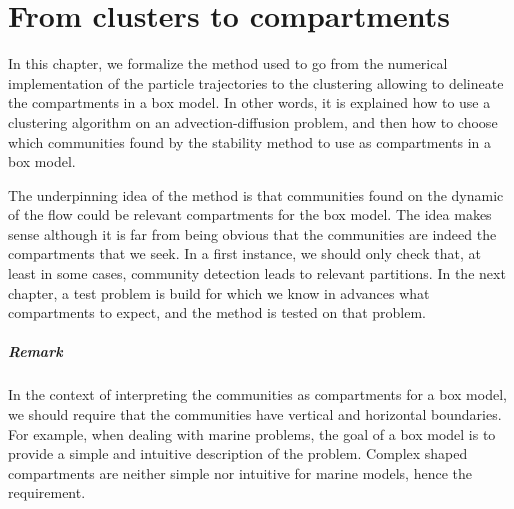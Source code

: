 \chapter{From clusters to compartments} \label{chap:method}
In this chapter, we formalize the method used to go from the numerical implementation of the particle trajectories to the clustering allowing to delineate the compartments in a box model. In other words, it is explained how to use a clustering algorithm on an advection-diffusion problem, and then how to choose which communities found by the stability method to use as compartments in a box model. 

The underpinning idea of the method is that communities found on the dynamic of the flow could be relevant compartments for the box model. The idea makes sense although it is far from being obvious that the communities are indeed the compartments that we seek. In a first instance, we should only check that, at least in some cases, community detection leads to relevant partitions. In the next chapter, a test problem is build for which we know in advances what compartments to expect, and the method is tested on that problem.

\paragraph{Remark} \label{remark:straightboundaries} In the context of interpreting the communities as compartments for a box model, we should require that the communities have vertical and horizontal boundaries. For example, when dealing with marine problems, the goal of a box model is to provide a simple and intuitive description of the problem. Complex shaped compartments are neither simple nor intuitive for marine models, hence the requirement.


% 
